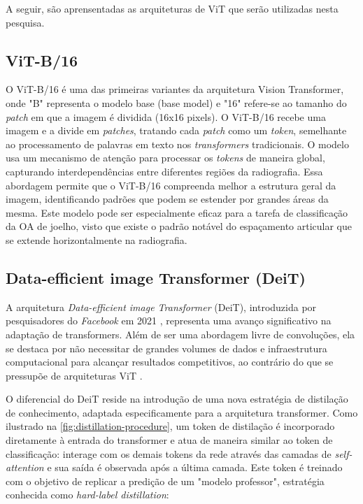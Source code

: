 A seguir, são aprensentadas as arquiteturas de ViT que serão utilizadas nesta pesquisa.

\subsection{ViT-B/16}

O ViT-B/16 \cite{Dosovitskiy2021} é uma das primeiras variantes da arquitetura Vision Transformer, onde "B" representa o modelo base (base model) e "16" refere-se ao tamanho do \textit{patch} em que a imagem é dividida (16x16 pixels). O ViT-B/16 recebe uma imagem e a divide em \textit{patches}, tratando cada \textit{patch} como um \textit{token}, semelhante ao processamento de palavras em texto nos \textit{transformers} tradicionais. O modelo usa um mecanismo de atenção para processar os \textit{tokens} de maneira global, capturando interdependências entre diferentes regiões da radiografia. Essa abordagem permite que o ViT-B/16 compreenda melhor a estrutura geral da imagem, identificando padrões que podem se estender por grandes áreas da mesma. Este modelo pode ser especialmente eficaz para a tarefa de classificação da OA de joelho, visto que existe o padrão notável do espaçamento articular que se extende horizontalmente na radiografia.

\subsection{Data-efficient image Transformer (DeiT)}

A arquitetura \textit{Data-efficient image Transformer} (DeiT), introduzida por pesquisadores do \textit{Facebook} em 2021 \citep{Touvron2021}, representa uma avanço significativo na adaptação de transformers. Além de ser uma abordagem livre de convoluções, ela se destaca por não necessitar de grandes volumes de dados e infraestrutura computacional para alcançar resultados competitivos, ao contrário do que se pressupõe de arquiteturas ViT \cite{Dosovitskiy2021}.

O diferencial do DeiT reside na introdução de uma nova estratégia de distilação de conhecimento, adaptada especificamente para a arquitetura transformer. Como ilustrado na \autoref{fig:distillation-procedure}, um token de distilação é incorporado diretamente à entrada do transformer e atua de maneira similar ao token de classificação: interage com os demais tokens da rede através das camadas de \textit{self-attention} e sua saída é observada após a última camada. Este token é treinado com o objetivo de replicar a predição de um "modelo professor", estratégia conhecida como \textit{hard-label distillation}:

